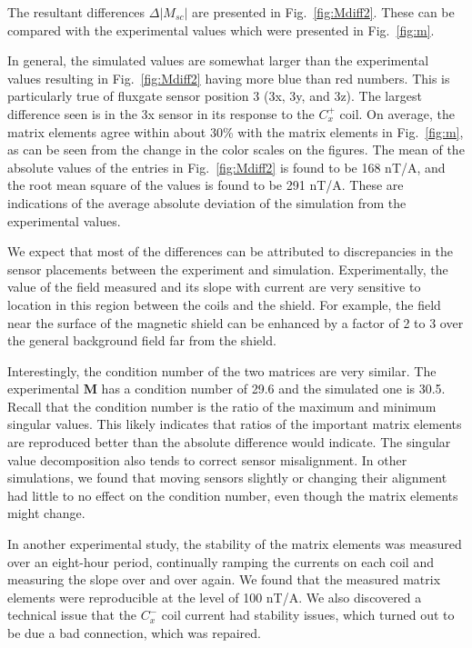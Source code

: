 The resultant differences $\Delta|M_{sc}|$ are presented in
Fig.~\ref{fig:Mdiff2}.  These can be compared with the experimental
values which were presented in Fig.~\ref{fig:m}.

In general, the simulated values are somewhat larger than the
experimental values resulting in Fig.~\ref{fig:Mdiff2} having more
blue than red numbers.  This is particularly true of fluxgate sensor
position 3 (3x, 3y, and 3z).  The largest difference seen is in the 3x
sensor in its response to the $C_x^+$ coil.  On average, the matrix
elements agree within about 30\% with the matrix elements in
Fig.~\ref{fig:m}, as can be seen from the change in the color scales
on the figures.  The mean of the absolute values of the entries in
Fig.~\ref{fig:Mdiff2} is found to be 168 nT/A, and the root mean
square of the values is found to be 291 nT/A.  These are indications
of the average absolute deviation of the simulation from the
experimental values.

We expect that most of the differences can be attributed to
discrepancies in the sensor placements between the experiment and
simulation.  Experimentally, the value of the field measured and its
slope with current are very sensitive to location in this region
between the coils and the shield.  For example, the field near the
surface of the magnetic shield can be enhanced by a factor of 2 to 3
over the general background field far from the shield.

Interestingly, the condition number of the two matrices are very
similar.  The experimental $\bm{M}$ has a condition number of 29.6 and the
simulated one is 30.5.  Recall that the condition number is the ratio
of the maximum and minimum singular values.  This likely indicates
that ratios of the important matrix elements are reproduced better
than the absolute difference would indicate.  The singular value
decomposition also tends to correct sensor misalignment.  In other
simulations, we found that moving sensors slightly or changing their
alignment had little to no effect on the condition number, even though
the matrix elements might change.

In another experimental study, the stability of the matrix
elements was measured over an eight-hour period, continually ramping the currents
on each coil and measuring the slope over and over again.  We found
that the measured matrix elements were reproducible at the level of
100 nT/A.  We also discovered a technical issue that the $C_x^-$ coil
current had stability issues, which turned out to be due a bad
connection, which was repaired.

